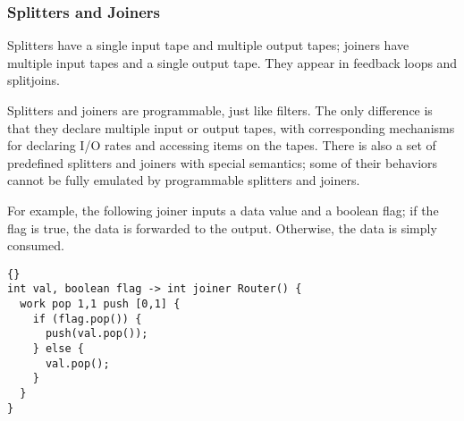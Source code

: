 \documentclass[11pt]{article}
\newcommand{\new}{\marginpar{\footnotesize \textbf{~~--~New~--}}}
\begin{document}
\subsubsection{Splitters and Joiners}
\label{sec:splitters-joiners}

Splitters have a single input tape and multiple output tapes; joiners
have multiple input tapes and a single output tape.  They appear in
feedback loops and splitjoins.

Splitters {\new} and joiners are programmable, just like filters.  The
only difference is that they declare multiple input or output tapes,
with corresponding mechanisms for declaring I/O rates and accessing
items on the tapes.  There is also a set of predefined splitters and
joiners with special semantics; some of their behaviors cannot be
fully emulated by programmable splitters and joiners.

For example, the following joiner inputs a data value and a boolean
flag; if the flag is true, the data is forwarded to the output.
Otherwise, the data is simply consumed.
\begin{lstlisting}{}
int val, boolean flag -> int joiner Router() {
  work pop 1,1 push [0,1] {
    if (flag.pop()) {
      push(val.pop());
    } else {
      val.pop();
    }
  }
}
\end{lstlisting}
\end{document}
